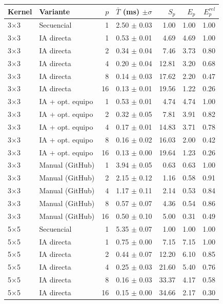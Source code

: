 \begin{tabular}{llrrrrr}
\toprule
Kernel & Variante & $p$ & $\bar{T}$ (ms) $\pm\sigma$ & $S_p$ & $E_p$ & $E^{rel}_p$ \\
\midrule
3$\times$3 & Secuencial & 1 & 2.50 $\pm$ 0.03 & 1.00 & 1.00 & 1.00 \\
3$\times$3 & IA directa & 1 & 0.53 $\pm$ 0.01 & 4.69 & 4.69 & 1.00 \\
3$\times$3 & IA directa & 2 & 0.34 $\pm$ 0.04 & 7.46 & 3.73 & 0.80 \\
3$\times$3 & IA directa & 4 & 0.20 $\pm$ 0.04 & 12.81 & 3.20 & 0.68 \\
3$\times$3 & IA directa & 8 & 0.14 $\pm$ 0.03 & 17.62 & 2.20 & 0.47 \\
3$\times$3 & IA directa & 16 & 0.13 $\pm$ 0.01 & 19.56 & 1.22 & 0.26 \\
3$\times$3 & IA + opt. equipo & 1 & 0.53 $\pm$ 0.01 & 4.74 & 4.74 & 1.00 \\
3$\times$3 & IA + opt. equipo & 2 & 0.32 $\pm$ 0.05 & 7.81 & 3.91 & 0.82 \\
3$\times$3 & IA + opt. equipo & 4 & 0.17 $\pm$ 0.01 & 14.83 & 3.71 & 0.78 \\
3$\times$3 & IA + opt. equipo & 8 & 0.16 $\pm$ 0.02 & 16.03 & 2.00 & 0.42 \\
3$\times$3 & IA + opt. equipo & 16 & 0.13 $\pm$ 0.00 & 19.64 & 1.23 & 0.26 \\
3$\times$3 & Manual (GitHub) & 1 & 3.94 $\pm$ 0.05 & 0.63 & 0.63 & 1.00 \\
3$\times$3 & Manual (GitHub) & 2 & 2.15 $\pm$ 0.12 & 1.16 & 0.58 & 0.91 \\
3$\times$3 & Manual (GitHub) & 4 & 1.17 $\pm$ 0.11 & 2.14 & 0.53 & 0.84 \\
3$\times$3 & Manual (GitHub) & 8 & 0.57 $\pm$ 0.07 & 4.36 & 0.54 & 0.86 \\
3$\times$3 & Manual (GitHub) & 16 & 0.50 $\pm$ 0.10 & 5.00 & 0.31 & 0.49 \\
\midrule
5$\times$5 & Secuencial & 1 & 5.35 $\pm$ 0.07 & 1.00 & 1.00 & 1.00 \\
5$\times$5 & IA directa & 1 & 0.75 $\pm$ 0.00 & 7.15 & 7.15 & 1.00 \\
5$\times$5 & IA directa & 2 & 0.44 $\pm$ 0.07 & 12.20 & 6.10 & 0.85 \\
5$\times$5 & IA directa & 4 & 0.25 $\pm$ 0.03 & 21.60 & 5.40 & 0.76 \\
5$\times$5 & IA directa & 8 & 0.16 $\pm$ 0.03 & 33.37 & 4.17 & 0.58 \\
5$\times$5 & IA directa & 16 & 0.15 $\pm$ 0.00 & 34.66 & 2.17 & 0.30 \\

\end{tabular}

